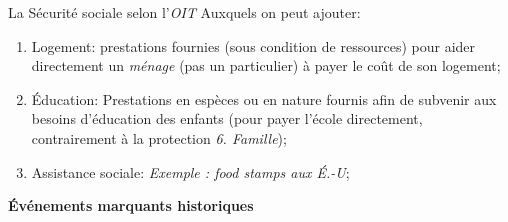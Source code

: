 \documentclass[10pt, french]{article}
\begin{document}
\begin{multicols*}{3}
\begin{conceptgen}{La Sécurité sociale selon l'\textit{OIT}}
Auxquels on peut ajouter:
\begin{enumerate}[leftmargin = *]
	\item	Logement: prestations fournies (sous condition de ressources) pour aider directement un \textit{ménage} (pas un particulier) à payer le coût de son logement;
	\item	Éducation: Prestations en espèces ou en nature fournis afin de subvenir aux besoins d'éducation des enfants (pour payer l'école directement, contrairement à la protection \textit{6. Famille});
	\item	Assistance sociale: \textit{Exemple : \og food stamps \fg{} aux É.-U};
\end{enumerate}
\end{conceptgen}

\textbf{Événements marquants historiques}


\end{multicols*}
\end{document}
